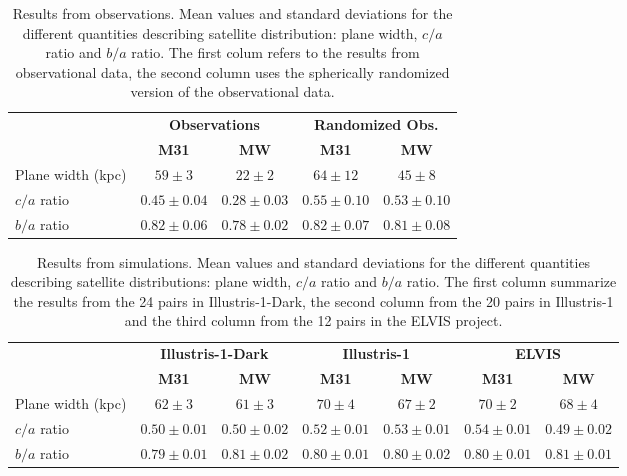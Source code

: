 \documentclass[a4paper,fleqn,usenatbib]{mnras}
\begin{document}
\begin{table}
  \centering
  \renewcommand{\arraystretch}{1.2}
  \begin{tabular}{|p{2.5cm}|c|c|c|c|}
    \hline
    \multirow{2}{4.0cm}{} & \multicolumn{2}{c|}{\textbf{Observations}} & \multicolumn{2}{c|}{\textbf{Randomized Obs.}} \\
    \cline{2-5}
    & \textbf{M31} & \textbf{MW} & \textbf{M31} & \textbf{MW} \\
    \hline
    Plane width (kpc) & $59\pm 3$  & $22\pm 2$  & $64\pm 12$   & $45\pm 8$    \\\hline
    $c/a$ ratio & $0.45\pm 0.04$ & $0.28\pm 0.03$ & $0.55\pm0.10$ & $0.53\pm 0.10$ \\ \hline
    $b/a$ ratio & $0.82\pm 0.06$ & $0.78\pm 0.02$ & $0.82\pm0.07$ & $0.81\pm 0.08$ \\ \hline
  \end{tabular}
  \caption{Results from observations. Mean values and standard deviations for the different
    quantities describing satellite distribution: plane width, $c/a$
    ratio and $b/a$ ratio. 
    The first colum refers to the results from
    observational data, the second column uses the spherically
    randomized version of the observational data. \label{table:observations}}
\end{table}


\begin{table}
  \centering
  \renewcommand{\arraystretch}{1.2}
  \begin{tabular}{|p{2.5cm}|c|c|c|c|c|c|}
    \hline
    \multirow{2}{4.0cm}{} & \multicolumn{2}{c|}{\textbf{Illustris-1-Dark}} & \multicolumn{2}{c|}{\textbf{Illustris-1}} & \multicolumn{2}{c|}{\textbf{ELVIS}}\\
    \cline{2-7}
    & \textbf{M31} & \textbf{MW} & \textbf{M31} & \textbf{MW}& \textbf{M31} & \textbf{MW}\\
    \hline
    Plane width (kpc) & $62\pm 3$   & $61\pm 3$     & $70\pm 4$ & $67\pm 2$ & $70\pm 2$& $68\pm 4$ \\\hline
    $c/a$ ratio & $0.50\pm0.01$ & $0.50\pm 0.02$ & $0.52\pm 0.01$ & $0.53\pm 0.01$ & $0.54\pm 0.01$& $0.49\pm 0.02$ \\ \hline
    $b/a$ ratio & $0.79\pm0.01$ & $0.81\pm 0.02$ & $0.80\pm 0.01$ & $0.80\pm 0.02$ & $0.80\pm0.01$& $0.81\pm 0.01$\\ \hline
  \end{tabular}
  \caption{Results from simulations. Mean values and standard deviations for the different
    quantities describing satellite distributions: plane width, $c/a$
    ratio and $b/a$ ratio. 
    The first column summarize the results from the 24 pairs in
    Illustris-1-Dark, the second column from the 20 pairs in
    Illustris-1 and the third column from the 12 pairs in the
    ELVIS project.\label{table:simulations}}
\end{table}
\end{document}
